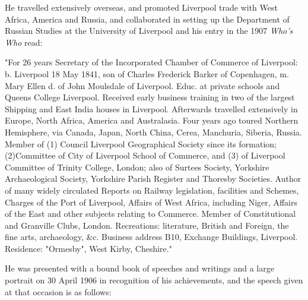 He travelled extensively overseas, and promoted Liverpool trade with West Africa, America and Russia, and collaborated in setting up the Department of Russian Studies at the University of Liverpool and his entry in  the 1907 \emph{Who's Who} read:

"For 26 years Secretary of the Incorporated Chamber of Commerce of Liverpool: b. Liverpool 18 May 1841, son of Charles Frederick Barker of Copenhagen, m. Mary Ellen d. of John Moulsdale of Liverpool. Educ. at private schools and Queens College Liverpool. Received early business training in two of the largest Shipping and East India houses in Liverpool. Afterwards travelled extensively in Europe, North Africa, America and Australasia. Four years ago toured Northern Hemisphere, via Canada, Japan, North China, Cerea, Manchuria, Siberia, Russia. Member of (1) Council Liverpool Geographical Society since its formation; (2)Committee of City of Liverpool School of Commerce, and (3) of Liverpool Committee of Trinity College, London; also of Surtees Society, Yorkshire Archaeological Society, Yorkshire Parish Register and Thoresby Societies. Author of many widely circulated Reports on Railway legislation, facilities and Schemes, Charges of the Port of Liverpool, Affairs of West Africa, including Niger, Affairs of the East and other subjects relating to Commerce. Member of Constitutional and Granville Clubs, London. Recreations: literature, British and Foreign, the fine arts, archaeology, \&c. Business address B10, Exchange Buildings, Liverpool. Residence: "Ormesby", West Kirby, Cheshire."

He was presented with a bound book of speeches and writings and a large portrait on 30 April 1906 in recognition of his achievements,  and the speech given at that occasion is as follows:


